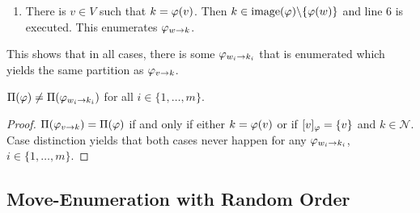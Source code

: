 \begin{\appendixproof}
\begin{enumerate}
\begin{enumerate}
\begin{enumerate}
                \item If $[w]_\idx = \{w,u\}$. 
                \begin{enumerate}
                    \item If $w < u$, then line \ref{alg:moveenum:l11} enumerates $\move{\idx}{w}{\ell}$ for $w$ and some $\ell \in \mathcal{N}$. But then $\Pi(\move{\idx}{w}{\ell}) = \Pi(\move{\idx}{w}{k})$.
                    \item If $u < w$, then line \ref{alg:moveenum:l11} enumerates $\move{\idx}{u}{\ell}$ for $u$ and some $\ell \in \mathcal{N}$. But then again, $\Pi(\move{\idx}{u}{\ell}) = \Pi(\move{\idx}{w}{k})$.
                \end{enumerate} 
            \end{enumerate}
            \item There is $v \in V$ such that $k = \varphi(v)$. Then $k \in \mathrm{image}(\varphi)\backslash \{ \varphi(w) \}$ and line 6 is executed. This enumerates $\varphi_{w\rightarrow k}$.
        \end{enumerate}
    \end{enumerate}
    This shows that in all cases, there is some $\varphi_{w_i\rightarrow k_i}$ that is enumerated which yields the same partition as $\varphi_{v\rightarrow k}$.
\end{\appendixproof}

\begin{lemma}
    $\Pi(\varphi) \neq \Pi(\varphi_{w_i\rightarrow k_i})$ for all $i\in \{1,\dots,m\}$. \label{lemma:self_neighbour}
\end{lemma}
\begin{proof}
    $\Pi(\varphi_{v\rightarrow k}) = \Pi(\varphi)$ if and only if either $k=\varphi(v)$ or if $[v]_\varphi = \{v\}$ and $k \in \mathcal{N}$. Case distinction yields that both cases never happen for any $\varphi_{w_i\rightarrow k_i}$, $i\in \{1,\dots,m\}$.
\end{proof}

\subsection{Move-Enumeration with Random Order}\label{sec:random_move_order}

